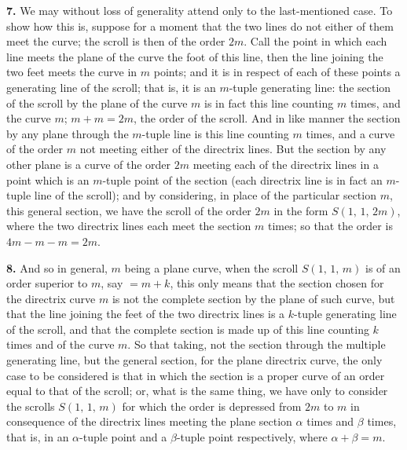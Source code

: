 \documentclass[11pt,a4paper]{article}
\begin{document}
\textbf{7.} We may without loss of generality attend only to the last-mentioned case. To show how this is, suppose for a moment that the two lines do not either of them meet the curve; the scroll is then of the order $2m$. Call the point in which each line meets the plane of the curve the foot of this line, then the line joining the two feet meets the curve in $m$ points; and it is in respect of each of these points a generating line of the scroll; that is, it is an $m$-tuple generating line: the section of the scroll by the plane of the curve $m$ is in fact this line counting $m$ times, and the curve $m$; $m + m = 2m$, the order of the scroll. And in like manner the section by any plane through the $m$-tuple line is this line counting $m$ times, and a curve of the order $m$ not meeting either of the directrix lines. But the section by any other plane is a curve of the order $2m$ meeting each of the directrix lines in a point which is an $m$-tuple point of the section (each directrix line is in fact an $m$-tuple line of the scroll); and by considering, in place of the particular section $m$, this general section, we have the scroll of the order $2m$ in the form $S(1,\,1,\,2m)$, where the two directrix lines each meet the section $m$ times; so that the order is $4m - m - m = 2m$.

\medskip

\textbf{8.} And so in general, $m$ being a plane curve, when the scroll $S(1,\,1,\,m)$ is of an order superior to $m$, say $= m + k$, this only means that the section chosen for the directrix curve $m$ is not the complete section by the plane of such curve, but that the line joining the feet of the two directrix lines is a $k$-tuple generating line of the scroll, and that the complete section is made up of this line counting $k$ times and of the curve $m$. So that taking, not the section through the multiple generating line, but the general section, for the plane directrix curve, the only case to be considered is that in which the section is a proper curve of an order equal to that of the scroll; or, what is the same thing, we have only to consider the scrolls $S(1,\,1,\,m)$ for which the order is depressed from $2m$ to $m$ in consequence of the directrix lines meeting the plane section $\alpha$ times and $\beta$ times, that is, in an $\alpha$-tuple point and a $\beta$-tuple point respectively, where $\alpha + \beta = m$.

\medskip
\end{document}
